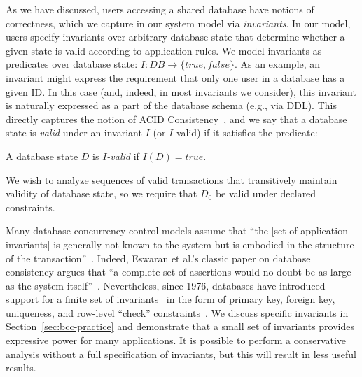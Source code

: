 As we have discussed, users accessing a shared
database have notions of correctness, which we capture in our system
model via \textit{invariants}. In our model, users specify invariants
over arbitrary database state that determine whether a given state is
valid according to application rules. We model invariants as
predicates over database state: $I: DB \rightarrow \{true, false\}$.  As
an example, an invariant might express the requirement that only one
user in a database has a given ID. In this case (and, indeed, in most
invariants we consider), this invariant is naturally expressed as a
part of the database schema (e.g., via DDL). This directly captures
the notion of ACID Consistency~\cite{bernstein-book,gray-virtues}, and
we say that a database state is \textit{valid} under an invariant $I$
(or $I$-valid) if it satisfies the predicate:

\begin{definition}
A database state $D$ is \textit{$I$-valid} if $I(D) = true$.
\end{definition}

We wish to analyze sequences of valid transactions that transitively
maintain validity of database state, so we require that $D_0$ be valid
under declared constraints.

 Many database concurrency
control models assume that ``the [set of application invariants] is
generally not known to the system but is embodied in the structure of
the transaction''~\cite{traiger-tods}. Indeed, Eswaran et al.'s
classic paper on database consistency argues that ``a complete set of
assertions would no doubt be as large as the system
itself''~\cite{eswaran-consistency}. Nevertheless, since 1976,
databases have introduced support for a finite set of
invariants~\cite{korth-serializability,decomp-semantics,garciamolina-semantics,ic-survey,ic-survey-two}
in the form of primary key, foreign key, uniqueness, and row-level
``check'' constraints~\cite{kemme-si-ic}. We discuss specific
invariants in Section~\ref{sec:bcc-practice} and demonstrate that a
small set of invariants provides expressive power for many
applications. It is possible to perform a conservative analysis
without a full specification of invariants, but this will result in
less useful results.\vspace{.5em}


